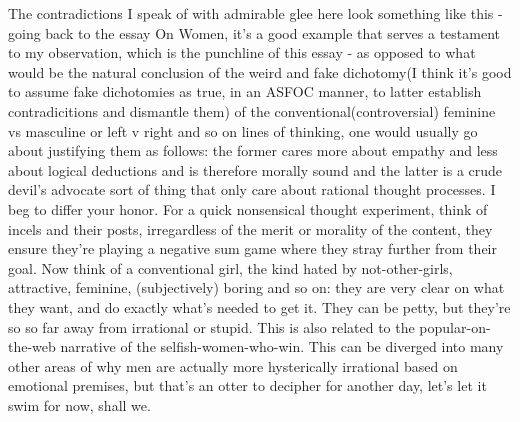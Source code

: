 The contradictions I speak of with admirable glee here look something like this - going back to the essay On Women, it's a good example that serves a testament to my observation, which is the punchline of this essay - as opposed to what would be the natural conclusion of the weird and fake dichotomy(I think it's good to assume fake dichotomies as true, in an ASFOC manner, to latter establish contradicitions and dismantle them) of the conventional(controversial) feminine vs masculine or left v right and so on lines of thinking, one would usually go about justifying them as follows: the former cares more about empathy and less about logical deductions and is therefore morally sound and the latter is a crude devil's advocate sort of thing that only care about rational thought processes. I beg to differ your honor. For a quick nonsensical thought experiment, think of incels and their posts, irregardless of the merit or morality of the content, they ensure they're playing a negative sum game where they stray further from their goal. Now think of a conventional girl, the kind hated by not-other-girls, attractive, feminine, (subjectively) boring and so on: they are very clear on what they want, and do exactly what's needed to get it. They can be petty, but they're so so far away from irrational or stupid. This is also related to the popular-on-the-web narrative of the selfish-women-who-win. This can be diverged into many other areas of why men are actually more hysterically irrational based on emotional premises, but that's an otter to decipher for another day, let's let it swim for now, shall we. 


